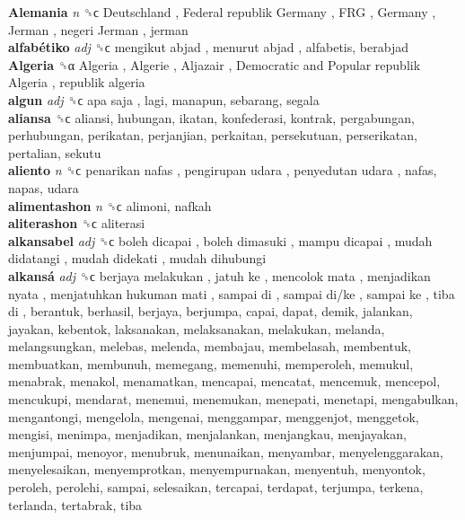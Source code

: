 \textbf{Alemania} \emph{n}  ␝ϲ   Deutschland ,  Federal republik Germany ,  FRG ,  Germany ,  Jerman ,  negeri Jerman , jerman  \\
\textbf{alfabétiko} \emph{adj}  ␝ϲ   mengikut abjad ,  menurut abjad , alfabetis, berabjad  \\
\textbf{Algeria} ␝α   Algeria ,  Algerie ,  Aljazair ,  Democratic and Popular republik Algeria ,  republik algeria   \\
\textbf{algun} \emph{adj}  ␝ϲ   apa saja , lagi, manapun, sebarang, segala  \\
\textbf{aliansa} ␝ϲ  aliansi, hubungan, ikatan, konfederasi, kontrak, pergabungan, perhubungan, perikatan, perjanjian, perkaitan, persekutuan, perserikatan, pertalian, sekutu  \\
\textbf{aliento} \emph{n}  ␝ϲ   penarikan nafas ,  pengirupan udara ,  penyedutan udara , nafas, napas, udara  \\
\textbf{alimentashon} \emph{n}  ␝ϲ  alimoni, nafkah  \\
\textbf{aliterashon} ␝ϲ  aliterasi  \\
\textbf{alkansabel} \emph{adj}  ␝ϲ   boleh dicapai ,  boleh dimasuki ,  mampu dicapai ,  mudah didatangi ,  mudah didekati ,  mudah dihubungi   \\
\textbf{alkansá} \emph{adj}  ␝ϲ   berjaya melakukan ,  jatuh ke ,  mencolok mata ,  menjadikan nyata ,  menjatuhkan hukuman mati ,  sampai di ,  sampai di/ke ,  sampai ke ,  tiba di , berantuk, berhasil, berjaya, berjumpa, capai, dapat, demik, jalankan, jayakan, kebentok, laksanakan, melaksanakan, melakukan, melanda, melangsungkan, melebas, melenda, membajau, membelasah, membentuk, membuatkan, membunuh, memegang, memenuhi, memperoleh, memukul, menabrak, menakol, menamatkan, mencapai, mencatat, mencemuk, mencepol, mencukupi, mendarat, menemui, menemukan, menepati, menetapi, mengabulkan, mengantongi, mengelola, mengenai, menggampar, menggenjot, menggetok, mengisi, menimpa, menjadikan, menjalankan, menjangkau, menjayakan, menjumpai, menoyor, menubruk, menunaikan, menyambar, menyelenggarakan, menyelesaikan, menyemprotkan, menyempurnakan, menyentuh, menyontok, peroleh, perolehi, sampai, selesaikan, tercapai, terdapat, terjumpa, terkena, terlanda, tertabrak, tiba  \\
